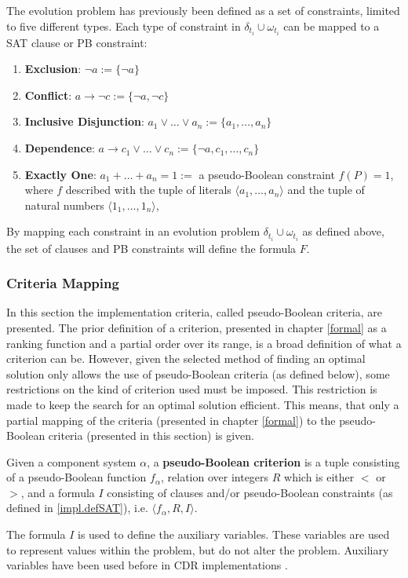The evolution problem has previously been defined as a set of constraints, limited to five different types.
Each type of constraint in $\delta_{t_i} \cup \omega_{t_i}$ can be mapped to a SAT clause or PB constraint:
\begin{enumerate}
  \item \textbf{Exclusion}: $\neg a := \{\neg a\}$
  \item \textbf{Conflict}: $a \rightarrow \neg c := \{\neg a, \neg c\}$ 
  \item \textbf{Inclusive Disjunction}: $a_1 \vee \ldots \vee a_n := \{a_1, \ldots,  a_n\}$ 
  \item \textbf{Dependence}: $a \rightarrow c_1 \vee \ldots \vee c_n := \{\neg a, c_1, \ldots, c_n\}$
  \item \textbf{Exactly One}: $a_1 + \ldots + a_n = 1 := $ a pseudo-Boolean constraint $f(P) = 1$, 
  where $f$ described with the tuple of literals $\langle a_1 ,\ldots , a_n\rangle$ and the tuple of natural numbers $\langle 1_1,\ldots,1_n \rangle$,
\end{enumerate}
By mapping each constraint in an evolution problem $\delta_{t_i} \cup \omega_{t_i}$ as defined above, the set of clauses and PB constraints will define the formula $F$.

\subsubsection{Criteria Mapping}
In this section the implementation criteria, called pseudo-Boolean criteria, are presented.
The prior definition of a criterion, presented in chapter \ref{formal} as a ranking function and a partial order over its range, is a broad definition of what a criterion can be.
However, given the selected method of finding an optimal solution only allows the use of pseudo-Boolean criteria (as defined below),
some restrictions on the kind of criterion used must be imposed.
This restriction is made to keep the search for an optimal solution efficient.
This means, that only a partial mapping of the criteria (presented in chapter \ref{formal}) to the pseudo-Boolean criteria (presented in this section) is given.

\begin{defs}
Given a component system $\alpha$, a \textbf{pseudo-Boolean criterion} is a tuple consisting of a pseudo-Boolean function $f_{\alpha}$,
relation over integers $R$ which is either $<$ or $>$, and a formula $I$ consisting of clauses and/or pseudo-Boolean constraints (as defined in \ref{impl.defSAT}),
i.e. $\langle f_{\alpha}, R , I \rangle$.
\end{defs}
The formula $I$ is used to define the auxiliary variables.
These variables are used to represent values within the problem, but do not alter the problem.
Auxiliary variables have been used before in CDR implementations \citep{argelich2010solving}.

